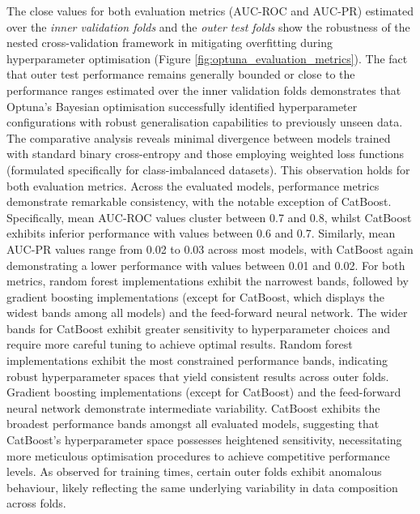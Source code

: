 The  close values for both evaluation metrics (AUC-ROC and AUC-PR) estimated over the \textcolor{colourInnerValidation}{\textit{inner validation folds}} and the \textcolor{colourOuterTest}{\textit{outer test folds}} show the robustness of the nested cross-validation framework in mitigating overfitting during hyperparameter optimisation  (Figure \ref{fig:optuna_evaluation_metrics}). The fact that outer test performance remains generally bounded or close to the performance ranges estimated over the inner validation folds demonstrates that Optuna's Bayesian optimisation successfully identified hyperparameter configurations with robust generalisation capabilities to previously unseen data. The comparative analysis reveals minimal divergence between models trained with standard binary cross-entropy and those employing weighted loss functions (formulated specifically for class-imbalanced datasets). This observation holds for both evaluation metrics. Across the evaluated models, performance metrics demonstrate remarkable consistency, with the notable exception of CatBoost. Specifically, mean AUC-ROC values cluster between 0.7 and 0.8, whilst CatBoost exhibits inferior performance with values between 0.6 and 0.7. Similarly, mean AUC-PR values range from 0.02 to 0.03 across most models, with CatBoost again demonstrating a lower performance with values between 0.01 and 0.02. For both metrics, random forest implementations exhibit the narrowest bands, followed by gradient boosting implementations (except for CatBoost, which displays the widest bands among all models) and the feed-forward neural network. The wider bands for CatBoost exhibit greater sensitivity to hyperparameter choices and require more careful tuning to achieve optimal results. Random forest implementations exhibit the most constrained performance bands, indicating robust hyperparameter spaces that yield consistent results across outer folds. Gradient boosting implementations (except for CatBoost) and the feed-forward neural network demonstrate intermediate variability. CatBoost exhibits the broadest performance bands amongst all evaluated models, suggesting that CatBoost's hyperparameter space possesses heightened sensitivity, necessitating more meticulous optimisation procedures to achieve competitive performance levels. As observed for training times, certain outer folds exhibit anomalous behaviour, likely reflecting the same underlying variability in data composition across folds.

